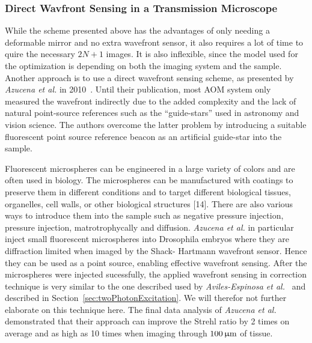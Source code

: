 \subsubsection{Direct Wavfront Sensing in a Transmission Microscope}
\label{sec:DirectTransmissionMicroscope}

\cite{wide_directSensing_microscope}

While the scheme presented above has the advantages of only needing a deformable mirror and no extra wavefront sensor, it also requires a lot of time to quire the necessary $2N+1$ images. It is also inflexible, since the model used for the optimization is depending on both the imaging system and the sample. Another approach is to use a direct wavefront sensing scheme, as presented by \emph{Azucena et al.} in 2010~\cite{wide_fluorescence_guide_star}. Until their publication, most AOM system only measured the wavefront indirectly due to the added complexity and the lack of natural point-source references such as the ``guide-stars'' used in astronomy and vision science. The authors overcome the latter problem by introducing a suitable fluorescent point source reference beacon as an artificial guide-star into the sample. 

Fluorescent microspheres can be engineered in a large variety of colors and are often used in biology. The microspheres can be manufactured with coatings to preserve them in different conditions and to target different biological tissues, organelles, cell walls, or other biological structures [14]. There are also various ways to introduce them into the sample such as negative pressure injection, pressure injection, matrotrophycally and diffusion. \emph{Azucena et al.} in particular inject small fluorescent microspheres into Drosophila embryos where they are diffraction limited when imaged by the Shack- Hartmann wavefront sensor. Hence they can be used as a point source, enabling effective wavefront sensing. After the microspheres were injected sucessfully, the applied wavefront sensing in correction technique is very similar to the one described used by \emph{Aviles-Espinosa et al.}~\cite{scan_TPFM_guide_start} and described in Section~\ref{sec:twoPhotonExcitation}. We will therefor not further elaborate on this technique here. The final data analysis of \emph{Azucena et al.}  demonstrated that their approach can improve the Strehl ratio by 2 times on average and as high as 10 times when imaging through $\unit[100]{\upmu m}$ of tissue.


